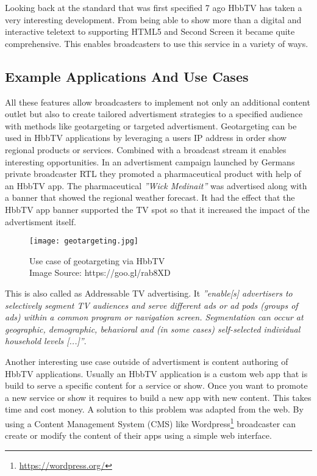 Looking back at the standard that was first specified 7 ago HbbTV has taken a very interesting
development. From being able to show more than a digital and interactive teletext to supporting
HTML5 and Second Screen it became quite comprehensive. This enables broadcasters to use this
service in a variety of ways.

\subsection{Example Applications And Use Cases}

All these features allow broadcasters to implement not only an additional content outlet but also
to create tailored advertisment strategies to a specified audience with methods like geotargeting
or targeted advertisment. Geotargeting can be used in HbbTV applications by leveraging a users
IP address in order show regional products or services. Combined with a broadcast stream it
enables interesting opportunities. In an advertisment campaign launched by Germans private
broadcaster RTL they promoted a pharmaceutical product with help of an HbbTV app. The pharmaceutical
\textit{''Wick Medinait''} was advertised along with a banner that showed the regional weather
forecast. It had the effect that the HbbTV app banner supported the TV spot so that it increased
the impact of the advertisment itself.

\begin{figure}[htb]
  \centering
  \texttt{[image: geotargeting.jpg]}\\
  \caption{
    Use case of geotargeting via HbbTV\\
    {\tiny Image Source: https://goo.gl/rab8XD}
  }
  \label{fig:geotargeting}
\end{figure}

This is also called as Addressable TV advertising. It \textit{''enable[s] advertisers to selectively
segment TV audiences and serve different ads or ad pods (groups of ads) within a common program or
navigation screen. Segmentation can occur at geographic, demographic, behavioral and (in some cases)
self-selected individual household levels [...]''}\cite{adrTV}.

Another interesting use case outside of advertisment is content authoring of HbbTV applications.
Usually an HbbTV application is a custom web app that is build to serve a specific content for
a service or show. Once you want to promote a new service or show it requires to build a new
app with new content. This takes time and cost money. A solution to this problem was adapted from
the web. By using a Content Management System (CMS) like Wordpress\footnote{\url{https://wordpress.org/}}
broadcaster can create or modify the content of their apps using a simple web interface.

